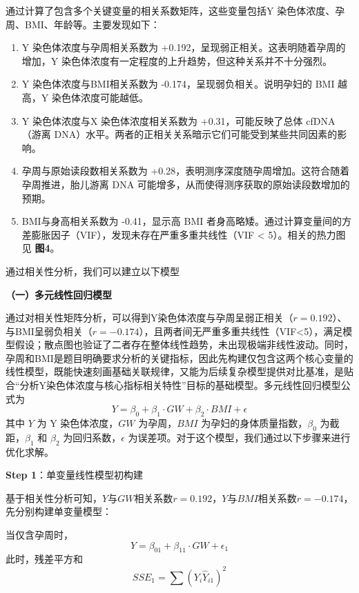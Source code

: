 \documentclass[withoutpreface,bwprint]{cumcmthesis} %
\begin{document}
通过计算了包含多个关键变量的相关系数矩阵，这些变量包括Y 染色体浓度、孕周、BMI、年龄等。主要发现如下：
\begin{enumerate}
    \item Y 染色体浓度与孕周相关系数为 +0.192，呈现弱正相关。这表明随着孕周的增加，Y 染色体浓度有一定程度的上升趋势，但这种关系并不十分强烈。
    \item Y 染色体浓度与BMI相关系数为 -0.174，呈现弱负相关。说明孕妇的 BMI 越高，Y 染色体浓度可能越低。
    \item Y 染色体浓度与X 染色体浓度相关系数为 +0.31，可能反映了总体 cfDNA（游离 DNA）水平。两者的正相关关系暗示它们可能受到某些共同因素的影响。
    \item 孕周与原始读段数相关系数为 +0.28，表明测序深度随孕周增加。这符合随着孕周推进，胎儿游离 DNA 可能增多，从而使得测序获取的原始读段数增加的预期。
    \item BMI与身高相关系数为 -0.41，显示高 BMI 者身高略矮。通过计算变量间的方差膨胀因子（VIF），发现未存在严重多重共线性（VIF < 5）。相关的热力图见 \textbf{图4}。
\end{enumerate}

通过相关性分析，我们可以建立以下模型


\textbf{（一）多元线性回归模型}

通过对相关性矩阵分析，可以得到Y染色体浓度与孕周呈弱正相关（$r=0.192$）、与BMI呈弱负相关（$r=-0.174$），且两者间无严重多重共线性（VIF<5），满足模型假设；散点图也验证了二者存在整体线性趋势，未出现极端非线性波动。同时，孕周和BMI是题目明确要求分析的关键指标，因此先构建仅包含这两个核心变量的线性模型，既能快速刻画基础关联规律，又能为后续复杂模型提供对比基准，是贴合“分析Y染色体浓度与核心指标相关特性”目标的基础模型。多元线性回归模型公式为
\begin{equation}
    Y = \beta_0 + \beta_1 \cdot GW + \beta_2 \cdot BMI + \epsilon
\end{equation}
其中 $Y$ 为 Y 染色体浓度，$GW$ 为孕周，$BMI$ 为孕妇的身体质量指数，$\beta_0$ 为截距，$\beta_1$ 和 $\beta_2$ 为回归系数，$\epsilon$ 为误差项。对于这个模型，我们通过以下步骤来进行优化求解。

\textbf{Step 1}：单变量线性模型初构建  

基于相关性分析可知，$Y$与$GW$相关系数$r=0.192$，$Y$与$BMI$相关系数$r=-0.174$，先分别构建单变量模型：

    当仅含孕周时，
    \begin{equation}
        Y = \beta_{01} + \beta_{11} \cdot GW + \epsilon_1
    \end{equation}
    此时，残差平方和
    \begin{equation}
        SSE_1 = \sum (Y_i \hat{Y}_{i1})^2
    \end{equation}
\end{document}
